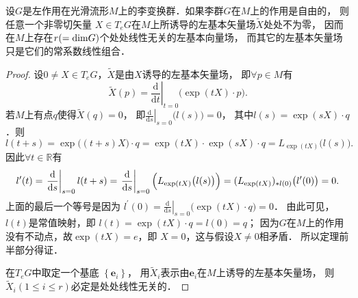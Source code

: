 \begin{theorem}\label{chlg:thm_Liefga}
    设$G$是左作用在光滑流形$M$上的李变换群．如果李群$G$在$M$上的作用是自由的，
    则任意一个非零切矢量 $X \in T_e G$在$M$上所诱导的左基本矢量场$\widetilde{X}$处处不为零，
    因而在$M$上存在$r(={\rm dim} G)$个处处线性无关的左基本向量场，
    而其它的左基本矢量场只是它们的常系数线性组合．
\end{theorem} 
\begin{proof}  
    设$0 \neq X \in T_e G$，$\widetilde{X}$是由$X$诱导的左基本矢量场，
    即$\forall p \in M$有
    \begin{equation}
        \widetilde{X}(p)=\left.\frac{\mathrm{d}}{\mathrm{d} t}\right|_{t=0}\bigl(\exp (t X)\cdot p\bigr) .
    \end{equation}
    若$M$上有点$q$使得$\widetilde{X}(q)=0$，
    即$\left.\frac{\mathrm{d}}{\mathrm{d} s}\right|_{s=0}\bigl(l(s) \bigr)=0$，
    其中$l(s)=\exp (s X)\cdot q$．则
    \begin{equation*}
        l(t+s)=\exp \bigl((t+s) X\bigr)\cdot q
        =\exp (t X) \cdot \exp (s X) \cdot q =L_{\exp (t X)}\bigl(l(s)\bigr) .
    \end{equation*}
    因此$\forall t \in \mathbb{R}$有
    \begin{equation*}
        l^{\prime}(t) =\left.\frac{\mathrm{d}}{\mathrm{d} s}\right|_{s=0} l(t+s)
        =\left.\frac{\mathrm{d}}{\mathrm{d} s}\right|_{s=0}\Bigl(L_{\exp (t X)}\bigl(l(s)\bigr)\Bigr) 
        =(L_{\exp (t X)})_{* l(0)}\bigl(l^{\prime}(0)\bigr)=0 .
    \end{equation*}
    上面的最后一个等号是因为
    $l^{\prime}(0)=\left.\frac{\mathrm{d}}{\mathrm{d} s}\right|_{s=0}\bigl(\exp (t X)\cdot q\bigr)=0$．
    由此可见，$l(t)$是常值映射，即
    $l(t)=\exp (t X)\cdot q=l(0)=q $；
    因为$G$在$M$上的作用没有不动点，故$\exp (t X)=e$，即 $X=0$，这与假设$X \neq 0$相矛盾．
    所以定理前半部分得证．
    
    在$T_e G$中取定一个基底 $\left\{\boldsymbol{e}_i\right\}$，
    用$\widetilde{X}_i$表示由$\boldsymbol{e}_i$在$M$上诱导的左基本矢量场，
    则$\widetilde{X}_i (1 \leqslant i \leqslant r)$必定是处处线性无关的．
\end{proof}





